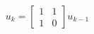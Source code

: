 \documentclass[preview]{standalone}
\begin{document}
\begin{center}
$$u_k = \begin{bmatrix} 1 & 1 \\ 1 & 0 \end{bmatrix} u_{k - 1}$$
\end{center}
\end{document}
